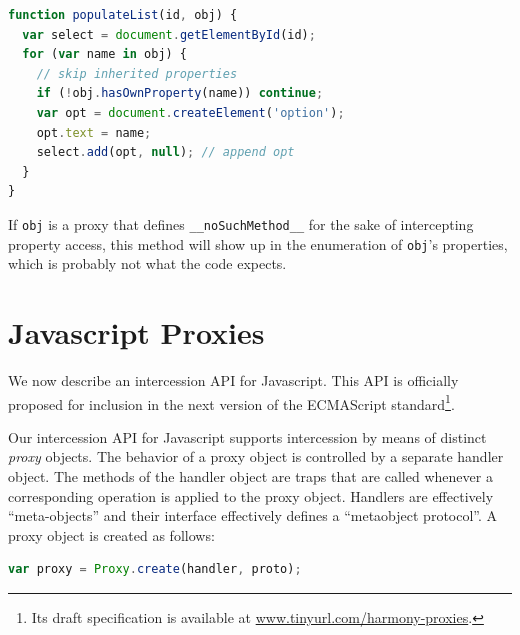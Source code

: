 \documentclass{sig-alternate}
\newcommand{\noSuchMethod}{\texttt{\_\_noSuchMethod\_\_}}
\begin{document}
\begin{lstlisting}[language=javascript]
function populateList(id, obj) {
  var select = document.getElementById(id);
  for (var name in obj) {
    // skip inherited properties
    if (!obj.hasOwnProperty(name)) continue;
    var opt = document.createElement('option');
    opt.text = name;
    select.add(opt, null); // append opt
  }
}
\end{lstlisting}

If \texttt{obj} is a proxy that defines \noSuchMethod{} for the sake of intercepting property access, this method will show up in the enumeration of \texttt{obj}'s properties, which is probably not what the code expects.


\section{Javascript Proxies}
\label{sec:proxies_for_javascript}

We now describe an intercession API for Javascript. This API is officially proposed for inclusion in the next version of the ECMAScript standard\footnote{Its draft specification is available at \url{www.tinyurl.com/harmony-proxies}.}.

Our intercession API for Javascript supports intercession by means of distinct \emph{proxy} objects. The behavior of a proxy object is controlled by a separate handler object. The methods of the handler object are traps that are called whenever a corresponding operation is applied to the proxy object. Handlers are effectively ``meta-objects'' and their interface effectively defines a ``metaobject protocol''. A proxy object is created as follows:

\begin{lstlisting}[language=javascript]
var proxy = Proxy.create(handler, proto);
\end{lstlisting}
\end{document}
